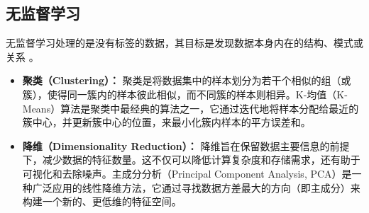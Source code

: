 \subsection{无监督学习}
\label{ssec:unsupervised_learning}
无监督学习处理的是没有标签的数据，其目标是发现数据本身内在的结构、模式或关系 \cite{glielmo2021unsupervised}。
\begin{itemize}
    \item \textbf{聚类（Clustering）：} 聚类是将数据集中的样本划分为若干个相似的组（或簇），使得同一簇内的样本彼此相似，而不同簇的样本则相异。K-均值（K-Means）算法是聚类中最经典的算法之一，它通过迭代地将样本分配给最近的簇中心，并更新簇中心的位置，来最小化簇内样本的平方误差和。
    \item \textbf{降维（Dimensionality Reduction）：} 降维旨在保留数据主要信息的前提下，减少数据的特征数量。这不仅可以降低计算复杂度和存储需求，还有助于可视化和去除噪声。主成分分析（Principal Component Analysis, PCA）是一种广泛应用的线性降维方法，它通过寻找数据方差最大的方向（即主成分）来构建一个新的、更低维的特征空间。
\end{itemize}

